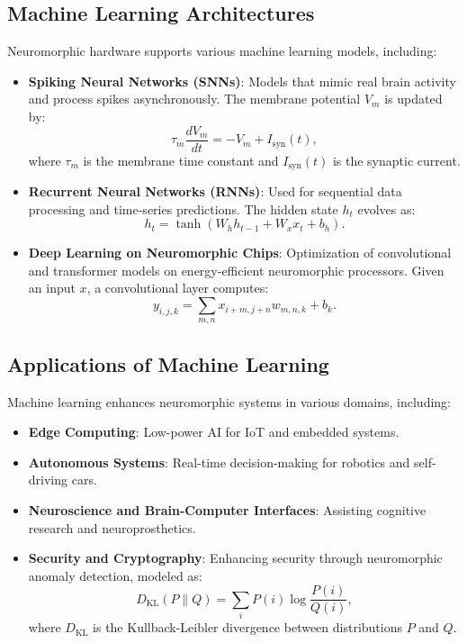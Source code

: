 \documentclass{article}
\theoremstyle{plain}
\begin{document}
\subsection{Machine Learning Architectures}
Neuromorphic hardware supports various machine learning models, including:
\begin{itemize}
    \item \textbf{Spiking Neural Networks (SNNs)}: Models that mimic real brain activity and process spikes asynchronously. The membrane potential $V_m$ is updated by:
    \begin{equation}
        \tau_m \frac{dV_m}{dt} = - V_m + I_{\text{syn}}(t),
    \end{equation}
    where $\tau_m$ is the membrane time constant and $I_{\text{syn}}(t)$ is the synaptic current.
    
    \item \textbf{Recurrent Neural Networks (RNNs)}: Used for sequential data processing and time-series predictions. The hidden state $h_t$ evolves as:
    \begin{equation}
        h_t = \tanh(W_h h_{t-1} + W_x x_t + b_h).
    \end{equation}
    
    \item \textbf{Deep Learning on Neuromorphic Chips}: Optimization of convolutional and transformer models on energy-efficient neuromorphic processors. Given an input $x$, a convolutional layer computes:
    \begin{equation}
        y_{i,j,k} = \sum_{m,n} x_{i+m, j+n} w_{m,n,k} + b_k.
    \end{equation}
\end{itemize}

\subsection{Applications of Machine Learning}
Machine learning enhances neuromorphic systems in various domains, including:
\begin{itemize}
    \item \textbf{Edge Computing}: Low-power AI for IoT and embedded systems.
    \item \textbf{Autonomous Systems}: Real-time decision-making for robotics and self-driving cars.
    \item \textbf{Neuroscience and Brain-Computer Interfaces}: Assisting cognitive research and neuroprosthetics.
    \item \textbf{Security and Cryptography}: Enhancing security through neuromorphic anomaly detection, modeled as:
    \begin{equation}
        D_{\text{KL}}(P \| Q) = \sum_i P(i) \log \frac{P(i)}{Q(i)},
    \end{equation}
    where $D_{\text{KL}}$ is the Kullback-Leibler divergence between distributions $P$ and $Q$.
\end{itemize}
\end{document}

